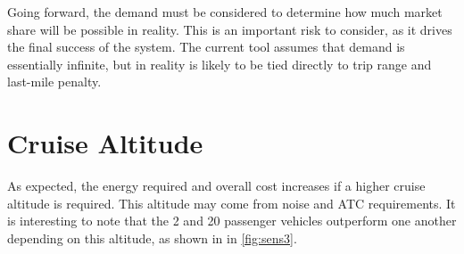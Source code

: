 Going forward, the demand must be considered to determine how much market share will be possible in reality. This is an important risk to consider, as it drives the final success of the system. The current tool assumes that demand is essentially infinite, but in reality is likely to be tied directly to trip range and last-mile penalty.


\section{Cruise Altitude}
As expected, the energy required and overall cost increases if a higher cruise altitude is required. This altitude may come from noise and ATC requirements. It is interesting to note that the 2 and 20 passenger vehicles outperform one another depending on this altitude, as shown in in \autoref{fig:sens3}.


